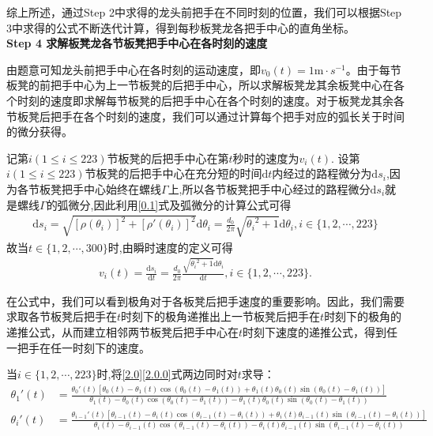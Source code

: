 \documentclass[../main.tex]{subfiles}
\begin{document}
      \par 综上所述，通过Step 2中求得的龙头前把手在不同时刻的位置，我们可以根据Step 3中求得的公式不断迭代计算，得到每秒板凳龙各把手中心的直角坐标。
   \\\textbf{Step 4 求解板凳龙各节板凳把手中心在各时刻的速度}
  \par 由题意可知龙头前把手中心在各时刻的运动速度，即\(v_0(t) = 1\mathrm{m}\cdot s^{-1}\)。由于每节板凳的前把手中心为上一节板凳的后把手中心，所以求解板凳龙其余板凳中心在各个时刻的速度即求解每节板凳的后把手中心在各个时刻的速度。对于板凳龙其余各节板凳后把手在各个时刻的速度，我们可以通过计算每个把手对应的弧长关于时间的微分获得。
  \par 记第\(i(1\leqslant i\leqslant 223)\)节板凳的后把手中心在第\(t\)秒时的速度为\(v_i(t)\).
  设第\(i(1\leqslant i\leqslant 223)\)节板凳的后把手中心在充分短的时间\(\mathrm{d}t\)内经过的路程微分为\(\mathrm{d}s_i\),因为各节板凳把手中心始终在螺线\(\varGamma\)上,所以各节板凳把手中心经过的路程微分\(\mathrm{d}s_i\)就是螺线\(\varGamma\)的弧微分,因此利用\eqref{0.1}式及弧微分的计算公式可得
  \begin{align}\label{1.........12}
  \mathrm{d}s_i=\sqrt{[\rho (\theta _i)]^2+[\rho \prime (\theta _i)]^2}\mathrm{d}\theta  _i=\frac{d_0}{2\pi}\sqrt{{\theta _i}^2+1}\mathrm{d}\theta _i,i\in \{ 1,2,\cdots ,223 \}  
  \end{align}
  故当\(t\in \{ 1,2,\cdots ,300 \}\)时,由瞬时速度的定义可得
  \begin{align}
  v_i(t) =\frac{\mathrm{d}s_i}{\mathrm{d}t}=\frac{d_0}{2\pi}\frac{\sqrt{{\theta _i}^2 + 1}\mathrm{d}\theta _i}{\mathrm{d}t}, i\in \{1, 2, \cdots, 223\}. \label{3.1}
  \end{align}
  \par 在公式中，我们可以看到极角对于各板凳后把手速度的重要影响。因此，我们需要求取各节板凳后把手在$t$时刻下的极角递推出上一节板凳后把手在$t$时刻下的极角的递推公式，从而建立相邻两节板凳后把手中心在$t$时刻下速度的递推公式，得到任一把手在任一时刻下的速度。
  \par 当\(i\in \{ 1,2,\cdots ,223 \}\)时,将\eqref{2.0}\eqref{2.0.0}式两边同时对\(t\)求导：
  \begin{align}
      \theta_{1}'(t)&=\frac{\theta_{0}'(t)[\theta_{0}(t)-\theta_{1}(t)\cos(\theta_{0}(t)-\theta_{1}(t))+\theta_{1}(t)\theta_{0}(t)\sin(\theta_{0}(t)-\theta_{1}(t))]}{\theta_{1}(t)-\theta_{0}(t)\cos(\theta_{0}(t)-\theta_{1}(t))-\theta_{1}(t)\theta_{0}(t)\sin(\theta_{0}(t)-\theta_{1}(t))} \label{3.1.2.3}
  \\
  \theta_{i}'(t)&=\frac{\theta_{i - 1}'(t)[\theta_{i - 1}(t)-\theta_{i}(t)\cos(\theta_{i - 1}(t)-\theta_{i}(t))+\theta_{i}(t)\theta_{i - 1}(t)\sin(\theta_{i - 1}(t)-\theta_{i}(t))]}{\theta_{i}(t)-\theta_{i - 1}(t)\cos(\theta_{i - 1}(t)-\theta_{i}(t))-\theta_{i}(t)\theta_{i - 1}(t)\sin(\theta_{i - 1}(t)-\theta_{i}(t))}\label{3.1.1.3}
  \end{align}
\end{document}
